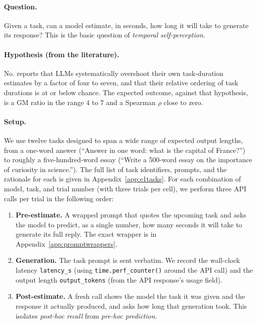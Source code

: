 \documentclass[11pt]{article}
\newcommand{\code}[1]{\texttt{\small #1}}
\begin{document}
\paragraph{Question.} Given a task, can a model estimate, in seconds, how long it will take to
generate its response? This is the basic question of \emph{temporal self-perception}.

\paragraph{Hypothesis (from the literature).} No. \citet{garikaparthi2026time} reports that
LLMs systematically overshoot their own task-duration estimates by a factor of four to seven,
and that their relative ordering of task durations is at or below chance. The expected
outcome, against that hypothesis, is a GM ratio in the range $4$ to $7$ and a Spearman $\rho$
close to zero.

\paragraph{Setup.} We use twelve tasks designed to span a wide range of expected output
lengths, from a one-word answer (``Answer in one word: what is the capital of France?'') to
roughly a five-hundred-word essay (``Write a 500-word essay on the importance of curiosity in
science.''). The full list of task identifiers, prompts, and the rationale for each is given
in Appendix~\ref{app:e1tasks}. For each combination of model, task, and trial number (with
three trials per cell), we perform three API calls per trial in the following order:

\begin{enumerate}
\item \textbf{Pre-estimate.} A wrapped prompt that quotes the upcoming task and asks the model
to predict, as a single number, how many seconds it will take to generate its full reply. The
exact wrapper is in Appendix~\ref{app:promptwrappers}.
\item \textbf{Generation.} The task prompt is sent verbatim. We record the wall-clock latency
\code{latency\_s} (using \code{time.perf\_counter()} around the API call) and the output
length \code{output\_tokens} (from the API response's usage field).
\item \textbf{Post-estimate.} A fresh call shows the model the task it was given and the
response it actually produced, and asks how long that generation took. This isolates
\emph{post-hoc recall} from \emph{pre-hoc prediction}.
\end{enumerate}
\end{document}
